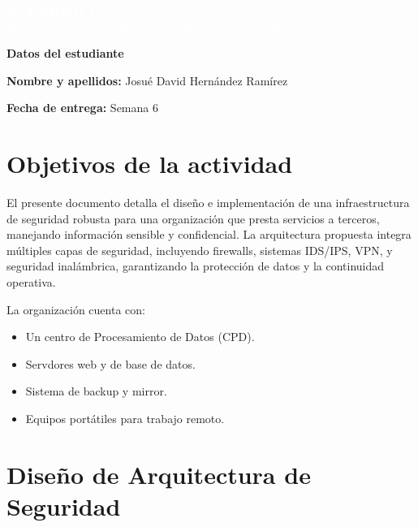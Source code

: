 \documentclass[12pt,letterpaper]{article}
\newcommand{\nombreestudiante}{Josué David Hernández Ramírez}
\newcommand{\fechaentrega}{Semana 6}
\begin{document}
\thispagestyle{firstpage}

\begin{center}
\colorbox{azuloscuro}{
\begin{minipage}{0.9\textwidth}
\vspace{0.3cm}
\centering
\textcolor{white}{\Large\textbf{ACTIVIDAD 1}}\\
\vspace{0.2cm}
\textcolor{white}{\large Infraestructura de defensa: Diseño de seguridad en redes}
\vspace{0.3cm}
\end{minipage}
}
\end{center}

\vspace{0.5cm}

\noindent
\colorbox{gray!10}{
\begin{minipage}{\textwidth}
\textbf{\textcolor{azuloscuro}{Datos del estudiante}}

\textbf{Nombre y apellidos:} \nombreestudiante

\textbf{Fecha de entrega:} \fechaentrega
\end{minipage}
}

\section{\textcolor{azuloscuro}{Objetivos de la actividad}}
El presente documento detalla el diseño e implementación de una infraestructura de seguridad robusta para una organización que presta servicios a terceros, manejando información sensible y confidencial. La arquitectura propuesta integra múltiples capas de seguridad, incluyendo firewalls, sistemas IDS/IPS, VPN, y seguridad inalámbrica, garantizando la protección de datos y la continuidad operativa.

La organización cuenta con:

\begin{itemize}[leftmargin=*]
    \item Un centro de Procesamiento de Datos (CPD).
    \item Servdores web y de base de datos.
    \item Sistema de backup y mirror.
    \item Equipos portátiles para trabajo remoto.
\end{itemize}

\section{\textcolor{azuloscuro}{Diseño de Arquitectura de Seguridad}}
\end{document}
